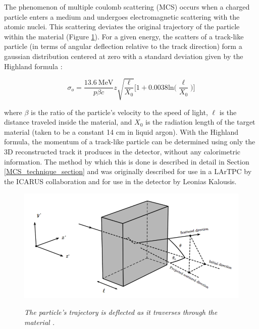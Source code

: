 The phenomenon of multiple coulomb scattering (MCS) occurs when a charged particle enters a medium and undergoes electromagnetic scattering with the atomic nuclei. This scattering deviates the original trajectory of the particle within the material (Figure \ref{mcs_nocap_fig}). For a given energy, the scatters of a track-like particle (in terms of angular deflection relative to the track direction) form a gaussian distribution centered at zero with a standard deviation given by the Highland formula \cite{highland}: 

\begin{equation}
	\sigma_o=\frac{13.6\  \text{MeV}}{p\beta c}z\sqrt{\frac{\ell}{X_0}}\Big[1+0.0038\text{ln}\Big(\frac{\ell}{X_0}\Big)\Big]
\end{equation}\label{highland_eqtn}

\noindent where $\beta$ is the ratio of the particle's velocity to the speed of light, $\ell$ is the distance traveled inside the material, and $X_0$ is the radiation length of the target material (taken to be a constant 14 cm in liquid argon). With the Highland formula, the momentum of a track-like particle can be determined using only the 3D reconstructed track it produces in the detector, without any calorimetric information. The method by which this is done is described in detail in Section \ref{MCS_technique_section} and was originally described for use in a LArTPC by the ICARUS collaboration\cite{icarus_mcs_paper} and for use in the \ub detector by Leonias Kalousis\cite{leonidas1}.

\begin{figure}[ht!]
\centering
	\includegraphics[width=0.5\linewidth]{Figures/static_figs/mcs_nocap.png} \\
\caption{\textit{The particle's trajectory is deflected as it traverses through the material \cite{leonidas1}.}}\label{mcs_nocap_fig}
\end{figure}